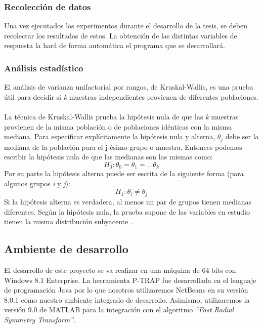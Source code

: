 \subsubsection{Recolecci\'on de datos}
Una vez ejecutados los experimentos durante el desarrollo de la tesis, se deben recolectar los resultados de estos. La obtenci\'on de las distintas variables de respuesta la har\'a de forma autom\'atica el programa que se desarrollar\'a. 
\subsubsection{An\'alisis estad\'istico}
El an\'alisis de varianza unifactorial por rangos, de Kruskal-Wallis\cite{kruskalwallis}, es una prueba \'util para decidir si \textit{k} muestras independientes provienen de diferentes poblaciones.
\\\\
La t\'ecnica de Kruskal-Wallis\cite{kruskalwallis} prueba la hip\'otesis nula de que las \textit{k} muestras provienen de la misma poblaci\'on o de poblaciones id\'enticas con la misma mediana. Para especificar expl\'icitamente la hip\'otesis nula y alterna, $\theta_j$ debe ser la mediana de la poblaci\'on para el j-\'esimo grupo o muestra.
Entonces podemos escribir la hip\'otesis nula de que las medianas son las mismas como:
\[H_0 : \theta_0 = \theta_1 = ...\theta_k \] 
Por su parte la hip\'otesis alterna puede ser escrita de la siguiente forma (para algunos grupos \textit{i} y \textit{j}):
\[H_1 : \theta_i \neq \theta_j \] 
Si la hip\'otesis alterna es verdadera, al menos un par de grupos tienen medianas diferentes. Seg\'un la hip\'otesis nula, la prueba supone de las variables en estudio tienen la misma distribuci\'on subyacente \cite{monicamontano}.
\subsection{Ambiente de desarrollo}
El desarrollo de este proyecto se va realizar en una m\'aquina de 64 bits con Windows 8.1 Enterprise. La herramienta P-TRAP\cite{ptrap} fue desarrollada en el lenguaje de programaci\'on Java por lo que nosotros utilizaremos NetBeans \cite{netbeans} en su versi\'on 8.0.1 como nuestro ambiente integrado de desarrollo. Asimismo, utilizaremos la versi\'on 9.0 de MATLAB \cite{matlab} para la integraci\'on con el algoritmo \textit{“Fast Radial Symmetry Transform”}\cite{loyzelinsky}.
